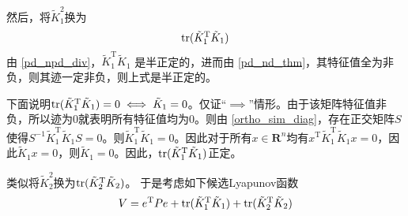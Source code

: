 然后，将$\tilde{K}_1^2$换为\[\operatorname{tr}(\tilde{K}_1^\mathrm{T}\tilde{K}_1)\]
由 \ref{pd_npd_div}，$\tilde{K}_1^\mathrm{T}\tilde{K}_1$ 是半正定的，进而由 \ref{pd_nd_thm}，其特征值全为非负，则其迹一定非负，则上式是半正定的。

下面说明$\operatorname{tr}(\tilde{K}_1^\mathrm{T}\tilde{K}_1)=0\iff \tilde{K}_1=0$。仅证“$\implies$”情形。由于该矩阵特征值非负，所以迹为$0$就表明所有特征值均为$0$。则由 \ref{ortho_sim_diag}，存在正交矩阵$S$使得$S^{-1}\tilde{K}_1^\mathrm{T}\tilde{K}_1S=0$。则$\tilde{K}_1^\mathrm{T}\tilde{K}_1=0$。因此对于所有$x\in\mathbf{R}^{n}$均有$x^{\mathrm{T}}\tilde{K}_1^\mathrm{T}\tilde{K}_1x=0$，因此$\tilde{K}_1x=0$，则$\tilde{K}_1=0$。因此，$\operatorname{tr}(\tilde{K}_1^\mathrm{T}\tilde{K}_1)$正定。

类似将$\tilde{K}_2^2$换为$\operatorname{tr}(\tilde{K}_2^\mathrm{T}\tilde{K}_2)$。
于是考虑如下候选Lyapunov函数
\begin{equation}\label{MODMIMOLYA:modify1}
V=e^\mathrm{T}Pe+\operatorname{tr}(\tilde{K}_1^\mathrm{T}\tilde{K}_1)+\operatorname{tr}(\tilde{K}_2^\mathrm{T}\tilde{K}_2)
\end{equation}

